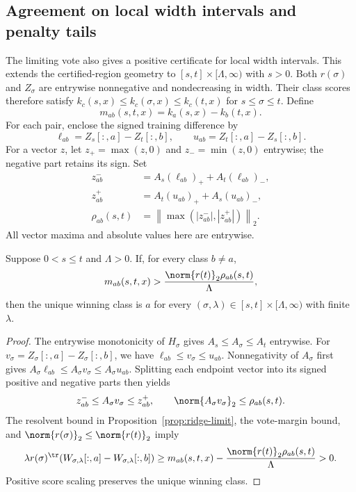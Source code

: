 \subsection{Agreement on local width intervals and penalty tails}
\label{sec:local-tail}
The limiting vote also gives a positive certificate for local width intervals.
This extends the certified-region geometry to $[s,t]\times[\Lambda,\infty)$
with $s>0$. Both $r(\sigma)$ and $Z_\sigma$ are entrywise nonnegative and
nondecreasing in width. Their class scores therefore satisfy
$k_c(s,x)\leq k_c(\sigma,x)\leq k_c(t,x)$ for $s\leq\sigma\leq t$.
Define
\[
 m_{ab}(s,t,x)=k_a(s,x)-k_b(t,x).
\]
For each pair, enclose the signed training difference by
\[
 \ell_{ab}=Z_s[:,a]-Z_t[:,b],\qquad
 u_{ab}=Z_t[:,a]-Z_s[:,b].
\]
For a vector $z$, let $z_+=\max(z,0)$ and $z_-=\min(z,0)$ entrywise;
the negative part retains its sign. Set
\begin{align*}
 z^-_{ab}&=A_s(\ell_{ab})_++A_t(\ell_{ab})_-,\\
 z^+_{ab}&=A_t(u_{ab})_++A_s(u_{ab})_-,\\
 \rho_{ab}(s,t)&=
 \left\|\max\left(|z^-_{ab}|,|z^+_{ab}|\right)\right\|_2.
\end{align*}
All vector maxima and absolute values here are entrywise.

\begin{theorem}
\label{thm:local-tail}
Suppose $0<s\leq t$ and $\Lambda>0$. If, for every class $b\ne a$,
\[
 m_{ab}(s,t,x)>
       \frac{\norm{r(t)}_2\rho_{ab}(s,t)}{\Lambda},
\]
then the unique winning class is $a$ for every
$(\sigma,\lambda)\in[s,t]\times[\Lambda,\infty)$ with finite $\lambda$.
\end{theorem}
\begin{proof}
The entrywise monotonicity of $H_\sigma$ gives
$A_s\leq A_\sigma\leq A_t$ entrywise. For
$v_\sigma=Z_\sigma[:,a]-Z_\sigma[:,b]$, we have
$\ell_{ab}\leq v_\sigma\leq u_{ab}$. Nonnegativity of $A_\sigma$
first gives $A_\sigma\ell_{ab}\leq A_\sigma v_\sigma
\leq A_\sigma u_{ab}$. Splitting each endpoint vector into its signed
positive and negative parts then yields
\[
 z^-_{ab}\leq A_\sigma v_\sigma\leq z^+_{ab},\qquad
 \norm{A_\sigma v_\sigma}_2\leq\rho_{ab}(s,t).
\]
The resolvent bound in Proposition~\ref{prop:ridge-limit}, the vote-margin
bound, and $\norm{r(\sigma)}_2\leq\norm{r(t)}_2$ imply
\[
 \lambda r(\sigma)^\tr
 (W_{\sigma,\lambda}[:,a]-W_{\sigma,\lambda}[:,b])
 \geq m_{ab}(s,t,x)-
       \frac{\norm{r(t)}_2\rho_{ab}(s,t)}{\Lambda}>0.
\]
Positive score scaling preserves the unique winning class.
\end{proof}

